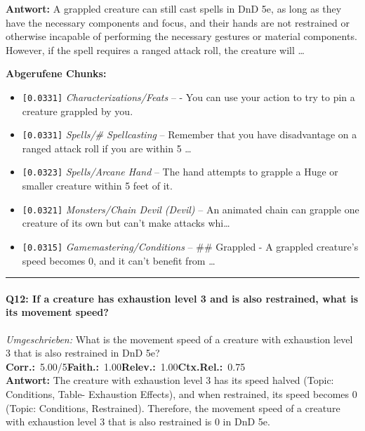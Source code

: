\noindent\textbf{Antwort:} A grappled creature can still cast spells in DnD 5e, as long as they have the necessary components and focus, and their hands are not restrained or otherwise incapable of performing the necessary gestures or material components. However, if the spell requires a ranged attack roll, the creature will \ldots

\noindent\textbf{Abgerufene Chunks:}
\begin{itemize}[noitemsep, topsep=2pt]
  \item[\textbf{\#1}] \texttt{[0.0331]} \textit{Characterizations/Feats} -- - You can use your action to try to pin a creature grappled by you.
  \item[\textbf{\#2}] \texttt{[0.0331]} \textit{Spells/# Spellcasting} -- Remember that you have disadvantage on a ranged attack roll if you are within 5 \ldots
  \item[\textbf{\#3}] \texttt{[0.0323]} \textit{Spells/Arcane Hand} -- The hand attempts to grapple a Huge or smaller creature within 5 feet of it.
  \item[\textbf{\#4}] \texttt{[0.0321]} \textit{Monsters/Chain Devil (Devil)} -- An animated chain can grapple one creature of its own but can't make attacks whi\ldots
  \item[\textbf{\#5}] \texttt{[0.0315]} \textit{Gamemastering/Conditions} -- \#\# Grappled  - A grappled creature's speed becomes 0, and it can't benefit from \ldots
\end{itemize}
\vspace{4pt}
\hrule
\vspace{6pt}

\paragraph{Q12: If a creature has exhaustion level 3 and is also restrained, what is its movement speed?}
\textit{Umgeschrieben:} What is the movement speed of a creature with exhaustion level 3 that is also restrained in DnD 5e?\\[2pt]
\noindent \textbf{Corr.:}~5.00/5\quad \textbf{Faith.:}~1.00\quad \textbf{Relev.:}~1.00\quad \textbf{Ctx.Rel.:}~0.75\\

\noindent\textbf{Antwort:} The creature with exhaustion level 3 has its speed halved (Topic: Conditions, Table- Exhaustion Effects), and when restrained, its speed becomes 0 (Topic: Conditions, Restrained). Therefore, the movement speed of a creature with exhaustion level 3 that is also restrained is 0 in DnD 5e.

